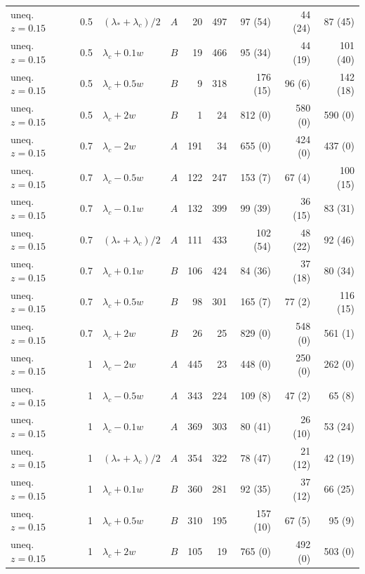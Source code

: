 \begin{longtable}{@{}lrllrrrrr@{}}
uneq. $z{=}0.15$ & 0.5 & $(\lambda_*+\lambda_c)/2$ & $A$ & 20 & 497 & 97 (54) & 44 (24) & 87 (45)\\
uneq. $z{=}0.15$ & 0.5 & $\lambda_c+0.1w$ & $B$ & 19 & 466 & 95 (34) & 44 (19) & 101 (40)\\
uneq. $z{=}0.15$ & 0.5 & $\lambda_c+0.5w$ & $B$ & 9 & 318 & 176 (15) & 96 (6) & 142 (18)\\
uneq. $z{=}0.15$ & 0.5 & $\lambda_c+2w$ & $B$ & 1 & 24 & 812 (0) & 580 (0) & 590 (0)\\
uneq. $z{=}0.15$ & 0.7 & $\lambda_c-2w$ & $A$ & 191 & 34 & 655 (0) & 424 (0) & 437 (0)\\
uneq. $z{=}0.15$ & 0.7 & $\lambda_c-0.5w$ & $A$ & 122 & 247 & 153 (7) & 67 (4) & 100 (15)\\
uneq. $z{=}0.15$ & 0.7 & $\lambda_c-0.1w$ & $A$ & 132 & 399 & 99 (39) & 36 (15) & 83 (31)\\
uneq. $z{=}0.15$ & 0.7 & $(\lambda_*+\lambda_c)/2$ & $A$ & 111 & 433 & 102 (54) & 48 (22) & 92 (46)\\
uneq. $z{=}0.15$ & 0.7 & $\lambda_c+0.1w$ & $B$ & 106 & 424 & 84 (36) & 37 (18) & 80 (34)\\
uneq. $z{=}0.15$ & 0.7 & $\lambda_c+0.5w$ & $B$ & 98 & 301 & 165 (7) & 77 (2) & 116 (15)\\
uneq. $z{=}0.15$ & 0.7 & $\lambda_c+2w$ & $B$ & 26 & 25 & 829 (0) & 548 (0) & 561 (1)\\
uneq. $z{=}0.15$ & 1 & $\lambda_c-2w$ & $A$ & 445 & 23 & 448 (0) & 250 (0) & 262 (0)\\
uneq. $z{=}0.15$ & 1 & $\lambda_c-0.5w$ & $A$ & 343 & 224 & 109 (8) & 47 (2) & 65 (8)\\
uneq. $z{=}0.15$ & 1 & $\lambda_c-0.1w$ & $A$ & 369 & 303 & 80 (41) & 26 (10) & 53 (24)\\
uneq. $z{=}0.15$ & 1 & $(\lambda_*+\lambda_c)/2$ & $A$ & 354 & 322 & 78 (47) & 21 (12) & 42 (19)\\
uneq. $z{=}0.15$ & 1 & $\lambda_c+0.1w$ & $B$ & 360 & 281 & 92 (35) & 37 (12) & 66 (25)\\
uneq. $z{=}0.15$ & 1 & $\lambda_c+0.5w$ & $B$ & 310 & 195 & 157 (10) & 67 (5) & 95 (9)\\
uneq. $z{=}0.15$ & 1 & $\lambda_c+2w$ & $B$ & 105 & 19 & 765 (0) & 492 (0) & 503 (0)\\
\bottomrule
\end{longtable}
